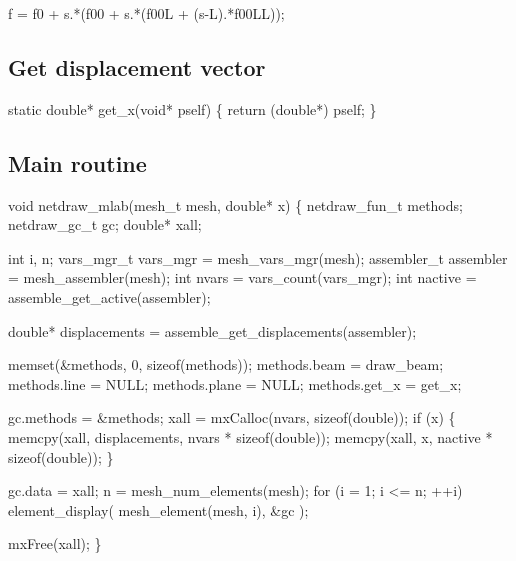 f = f0 + s.*(f00 + s.*(f00L + (s-L).*f00LL));

\nwendcode{}\nwdocspar

\subsection{Get displacement vector}

\nwenddocs{}\plusendmoddef
static double* get_x(void* pself)
\{
    return (double*) pself;
\}

\nwendcode{}\nwdocspar

\subsection{Main routine}

\nwenddocs{}\endmoddef
void netdraw_mlab(mesh_t mesh, double* x)
\{
    netdraw_fun_t methods;
    netdraw_gc_t  gc;
    double*       xall;

    int          i, n;
    vars_mgr_t   vars_mgr  = mesh_vars_mgr(mesh);
    assembler_t  assembler = mesh_assembler(mesh);
    int          nvars     = vars_count(vars_mgr);
    int          nactive   = assemble_get_active(assembler);

    double*      displacements = assemble_get_displacements(assembler);

    memset(&methods, 0, sizeof(methods));
    methods.beam = draw_beam;
    methods.line = NULL;
    methods.plane = NULL;
    methods.get_x = get_x;

    gc.methods   = &methods;
    xall         = mxCalloc(nvars, sizeof(double));
    if (x) \{
        memcpy(xall, displacements, nvars * sizeof(double));
        memcpy(xall, x, nactive * sizeof(double));
    \}

    gc.data = xall;
    n = mesh_num_elements(mesh);
    for (i = 1; i <= n; ++i)
        element_display( mesh_element(mesh, i), &gc );

    mxFree(xall);
\}

\nwendcode{}

